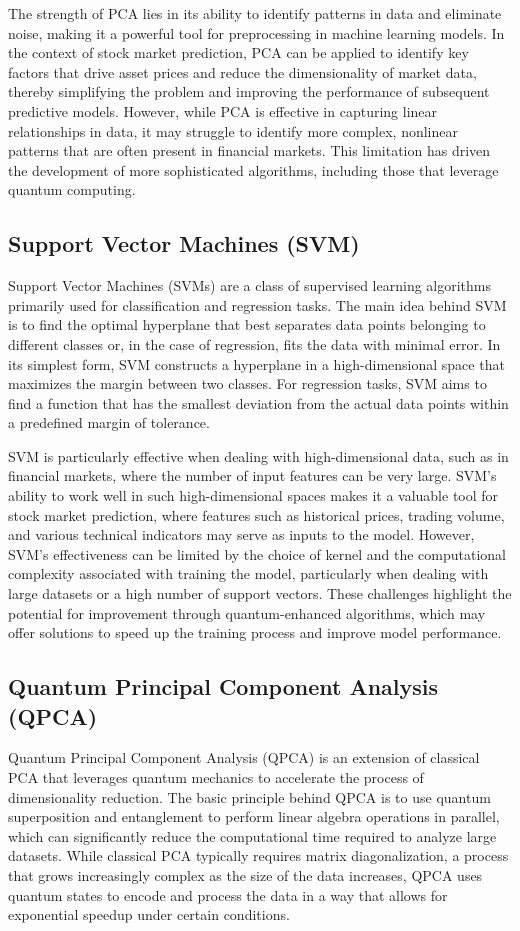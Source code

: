 \documentclass[journal]{IEEEtran}
\begin{document}
The strength of PCA lies in its ability to identify patterns in data and eliminate noise, making it a powerful tool for preprocessing in machine learning models. In the context of stock market prediction, PCA can be applied to identify key factors that drive asset prices and reduce the dimensionality of market data, thereby simplifying the problem and improving the performance of subsequent predictive models. However, while PCA is effective in capturing linear relationships in data, it may struggle to identify more complex, nonlinear patterns that are often present in financial markets. This limitation has driven the development of more sophisticated algorithms, including those that leverage quantum computing.

\subsection{Support Vector Machines (SVM)}
Support Vector Machines (SVMs) are a class of supervised learning algorithms primarily used for classification and regression tasks. The main idea behind SVM is to find the optimal hyperplane that best separates data points belonging to different classes or, in the case of regression, fits the data with minimal error. In its simplest form, SVM constructs a hyperplane in a high-dimensional space that maximizes the margin between two classes. For regression tasks, SVM aims to find a function that has the smallest deviation from the actual data points within a predefined margin of tolerance.

SVM is particularly effective when dealing with high-dimensional data, such as in financial markets, where the number of input features can be very large. SVM's ability to work well in such high-dimensional spaces makes it a valuable tool for stock market prediction, where features such as historical prices, trading volume, and various technical indicators may serve as inputs to the model. However, SVM's effectiveness can be limited by the choice of kernel and the computational complexity associated with training the model, particularly when dealing with large datasets or a high number of support vectors. These challenges highlight the potential for improvement through quantum-enhanced algorithms, which may offer solutions to speed up the training process and improve model performance.

\subsection{Quantum Principal Component Analysis (QPCA)}
Quantum Principal Component Analysis (QPCA) is an extension of classical PCA that leverages quantum mechanics to accelerate the process of dimensionality reduction. The basic principle behind QPCA is to use quantum superposition and entanglement to perform linear algebra operations in parallel, which can significantly reduce the computational time required to analyze large datasets. While classical PCA typically requires matrix diagonalization, a process that grows increasingly complex as the size of the data increases, QPCA uses quantum states to encode and process the data in a way that allows for exponential speedup under certain conditions.
\end{document}
